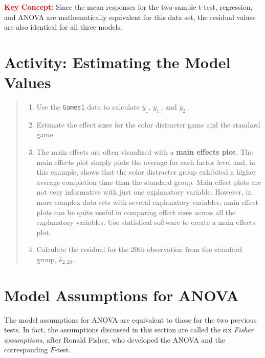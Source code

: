 \documentclass[
]{report}
\providecommand{\tightlist}{%
  \setlength{\itemsep}{0pt}\setlength{\parskip}{0pt}}
\begin{document}
\Large

\textbf{\textcolor{red}{Key Concept:}}
\color{red}
Since the mean responses for the two-sample t-test, regression, and ANOVA are mathematically equivalent for this data set, the residual values are also identical for all three models.
\color{black}
\normalsize

\section*{Activity: Estimating the Model Values}\label{activity-estimating-the-model-values}

\begin{quote}
\begin{enumerate}
\def\labelenumi{\arabic{enumi}.}
\setcounter{enumi}{18}
\tightlist
\item
  Use the \texttt{Games1} data to calculate \(\bar{y}_{..}\), \(\bar{y}_{1.}\), and \(\bar{y}_{2.}\).
\item
  Estimate the effect sizes for the color distracter game and the standard game.
\item
  The main effects are often visualized with a \textbf{main effects plot}. The main effects plot simply plots the average for each factor level and, in this example, shows that the color distracter group exhibited a higher average completion time than the standard group. Main effect plots are not very informative with just one explanatory variable. However, in more complex data sets with several explanatory variables, main effect plots can be quite useful in comparing effect sizes across all the explanatory variables. Use statistical software to create a main effects plot.
\item
  Calculate the residual for the 20th observation from the standard group, \(\hat{e}_{2, 20}\).
\end{enumerate}
\end{quote}

\section*{Model Assumptions for ANOVA}\label{model-assumptions-for-anova}

The model assumptions for ANOVA are equivalent to those for the two previous tests. In fact, the assumptions discussed in this section are called the six \emph{Fisher assumptions}, after Ronald Fisher, who developed the ANOVA and the corresponding \(F\)-test.
\end{document}
